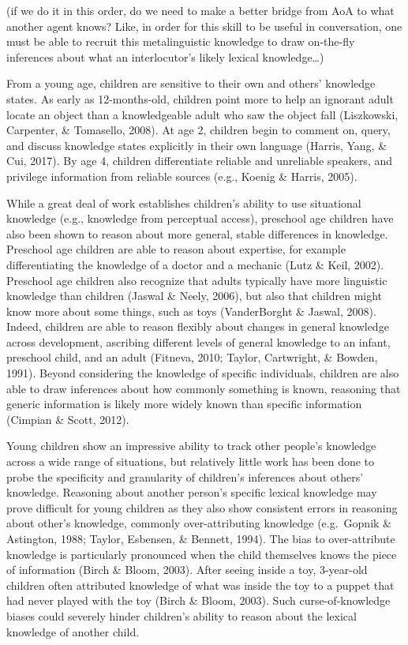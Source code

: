 \documentclass[10pt, letterpaper]{article}
\begin{document}
(if we do it in this order, do we need to make a better bridge from AoA
to what another agent knows? Like, in order for this skill to be useful
in conversation, one must be able to recruit this metalinguistic
knowledge to draw on-the-fly inferences about what an interlocutor's
likely lexical knowledge\ldots{})

From a young age, children are sensitive to their own and others'
knowledge states. As early as 12-months-old, children point more to help
an ignorant adult locate an object than a knowledgeable adult who saw
the object fall (Liszkowski, Carpenter, \& Tomasello, 2008). At age 2,
children begin to comment on, query, and discuss knowledge states
explicitly in their own language (Harris, Yang, \& Cui, 2017). By age 4,
children differentiate reliable and unreliable speakers, and privilege
information from reliable sources (e.g., Koenig \& Harris, 2005).

While a great deal of work establishes children's ability to use
situational knowledge (e.g., knowledge from perceptual access),
preschool age children have also been shown to reason about more
general, stable differences in knowledge. Preschool age children are
able to reason about expertise, for example differentiating the
knowledge of a doctor and a mechanic (Lutz \& Keil, 2002). Preschool age
children also recognize that adults typically have more linguistic
knowledge than children (Jaswal \& Neely, 2006), but also that children
might know more about some things, such as toys (VanderBorght \& Jaswal,
2008). Indeed, children are able to reason flexibly about changes in
general knowledge across development, ascribing different levels of
general knowledge to an infant, preschool child, and an adult (Fitneva,
2010; Taylor, Cartwright, \& Bowden, 1991). Beyond considering the
knowledge of specific individuals, children are also able to draw
inferences about how commonly something is known, reasoning that generic
information is likely more widely known than specific information
(Cimpian \& Scott, 2012).

Young children show an impressive ability to track other people's
knowledge across a wide range of situations, but relatively little work
has been done to probe the specificity and granularity of children's
inferences about others' knowledge. Reasoning about another person's
specific lexical knowledge may prove difficult for young children as
they also show consistent errors in reasoning about other's knowledge,
commonly over-attributing knowledge (e.g.~Gopnik \& Astington, 1988;
Taylor, Esbensen, \& Bennett, 1994). The bias to over-attribute
knowledge is particularly pronounced when the child themselves knows the
piece of information (Birch \& Bloom, 2003). After seeing inside a toy,
3-year-old children often attributed knowledge of what was inside the
toy to a puppet that had never played with the toy (Birch \& Bloom,
2003). Such curse-of-knowledge biases could severely hinder children's
ability to reason about the lexical knowledge of another child.
\end{document}
